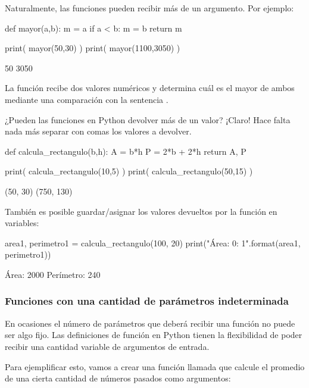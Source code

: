 Naturalmente, las funciones pueden recibir más de un argumento. Por ejemplo:

\begin{python}
def mayor(a,b):
    m = a
    if a < b:
        m = b
    return m

print( mayor(50,30) )
print( mayor(1100,3050) )
\end{python}
\begin{outscript}
50
3050
\end{outscript}

La función  recibe dos valores numéricos y determina cuál es el mayor de ambos mediante 
una comparación con la sentencia . 

¿Pueden las funciones en Python devolver más de un valor? ¡Claro! Hace falta nada más separar 
con comas los valores a devolver.

\begin{python}
def calcula_rectangulo(b,h):
    A = b*h
    P = 2*b + 2*h
    return A, P

print( calcula_rectangulo(10,5) )
print( calcula_rectangulo(50,15) )
\end{python}
\begin{outscript}
(50, 30)
(750, 130)
\end{outscript}

También es posible guardar/asignar los valores devueltos por la función en variables:

\begin{python}
area1, perimetro1 = calcula_rectangulo(100, 20)
print("Área: {0}: {1}".format(area1, perimetro1))
\end{python}
\begin{outscript}
Área: 2000
Perímetro: 240
\end{outscript}


\subsubsection{Funciones con una cantidad de parámetros indeterminada}

En ocasiones el número de parámetros que deberá recibir una función no puede ser algo fijo. 
Las definiciones de función en Python tienen la flexibilidad de poder recibir una cantidad 
variable de argumentos de entrada. 

Para ejemplificar esto, vamos a crear una función llamada  que calcule 
el promedio de una cierta cantidad de números pasados como argumentos:

